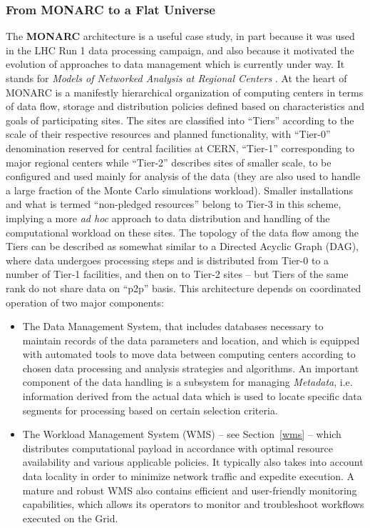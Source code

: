 \subsubsection{From MONARC to a Flat Universe}
The \textbf{MONARC} architecture is a useful case study, in part because it was used in the LHC Run 1 data processing campaign,
and also because it motivated the evolution of approaches to data management which is currently under way.
It stands for \textit{Models of Networked Analysis at Regional Centers} \cite{monarc}.
At the heart of  MONARC  is a manifestly hierarchical organization of computing centers in terms of
data flow, storage and distribution policies defined based on characteristics and goals of participating sites. The sites
are classified into ``Tiers'' according to the scale of their respective resources and planned functionality, with ``Tier-0'' denomination
reserved for central facilities at CERN, ``Tier-1'' corresponding to major regional centers while ``Tier-2'' describes
sites of smaller scale, to be configured and used mainly for analysis of the data (they are also used
to handle a large fraction of the Monte Carlo simulations workload). Smaller installations and what is termed ``non-pledged resources'' 
belong to Tier-3 in this scheme, implying a more \textit{ad hoc} approach to data distribution and handling of the computational
workload on these sites. The topology of the data flow among the
Tiers can be described as somewhat similar to a Directed Acyclic Graph (DAG), where data undergoes processing steps 
and is distributed from Tier-0 to a number of Tier-1 facilities, and then on to Tier-2 sites -- but Tiers of the same rank
do not share data on ``p2p'' basis.
This architecture depends on coordinated operation of two major components:
\begin{itemize}
	\item The Data Management System, that includes databases necessary to maintain records of the data parameters and location,
	and which is equipped with automated tools to move data between 
	computing centers according to chosen data processing and analysis strategies and algorithms. 
	An important component of the data handling is a subsystem for managing \textit{Metadata}, i.e. information
	derived from the actual data which is used to locate specific data segments for processing based on 
	certain selection criteria.
	
	\item The Workload Management System (WMS) -- see Section~\ref{wms} -- which distributes computational payload in accordance  
	with optimal resource availability and various applicable policies. It typically also takes
	into account data locality in order to minimize network traffic and expedite execution. A mature 
	and robust WMS also contains efficient and user-friendly monitoring capabilities, which allows 
	its operators to monitor and troubleshoot workflows executed on the Grid.
	
\end{itemize}

